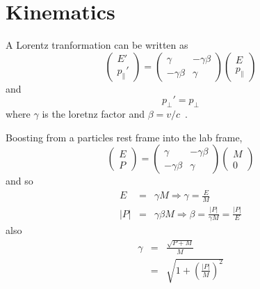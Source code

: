 \chapter{Kinematics}
\label{app:kinematics}
A Lorentz tranformation can be written as
\begin{equation}
\left(\begin{array}{c} E' \\ p_{\parallel}' \end{array} \right)
=
\left(
\begin{array}{cc}
\gamma & -\gamma\beta \\
-\gamma\beta & \gamma
\end{array}
\right)
\left (\begin{array}{c} E \\ p_{\parallel} \end{array}\right)
\end{equation}
and
\begin{equation}
p_{\perp}' = p_{\perp}
\end{equation}
where $\gamma$ is the loretnz factor and $\beta=v/c$~\cite{pdg}.

Boosting from a particles rest frame into the lab frame,
\begin{equation}
\left(\begin{array}{c} E \\ P \end{array} \right)
=
\left(
\begin{array}{cc}
\gamma & -\gamma\beta \\
-\gamma\beta & \gamma
\end{array}
\right)
\left (\begin{array}{c} M \\ 0 \end{array}\right)
\end{equation}
and so
\begin{eqnarray*}
E &=& \gamma M  \Longrightarrow \gamma = \frac{E}{M} \\
|P| &=& \gamma\beta M \Longrightarrow \beta = \frac{|P|}{\gamma M} = \frac{|P|}{E}
\end{eqnarray*}
also
\begin{eqnarray*}
\gamma &=& \frac{\sqrt{P + M}}{M} \\
&=& \sqrt{1 +\left(\frac{|P|}{M}\right)^2}
\end{eqnarray*}
